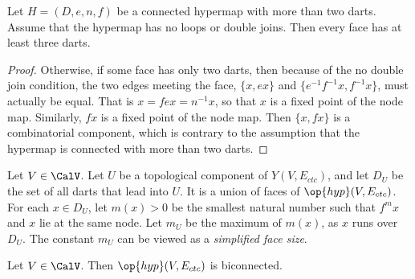 \begin{lemma}\label{lemma:dj}
Let $H=(D,e,n,f)$ be a connected hypermap with more than
two darts.  Assume that the hypermap has no loops or double joins. Then
every face has at least three darts.
\end{lemma}

\begin{proof}
Otherwise,
if some face has only two darts, then because of the no double join
condition, the two edges meeting the face, $\{x, e x\}$ and $\{ e^{-1} f^{-1} x, f^{-1}
x\}$, must actually be equal.  That is $ x = f e x = n^{-1} x$, so that
$x$ is a fixed point of the node map.  Similarly, $f x$ is a fixed
point of the node map.  Then $\{x, f x\}$ is a combinatorial
component, which is contrary to the assumption that the hypermap is
connected with more than two darts.
\end{proof}


\begin{definition}[$D_U$,~$m_U$]
Let $V\in \CalV$.  Let $U$ be a topological component of
$Y(V,E_{ctc})$, and let $D_U$ be the set of all darts that lead into
$U$.  It is a union of faces of $\op{hyp}(V,E_{ctc})$.  For each $x\in
D_U$, let $m(x) >0$ be the smallest natural number such that $f^m
x$ and $x$ lie at the same node.   Let $m_U$ be the maximum of $m(x)$, as
$x$ runs over $D_U$.  The constant $m_U$ can be viewed as a
{\it simplified face size}. 
%
%
%
\end{definition}

\begin{lemma}[biconnected]\label{lemma:biconnected}
  Let $V\in \CalV$.  Then $\op{hyp}(V,E_{ctc})$ is biconnected.
\end{lemma}

